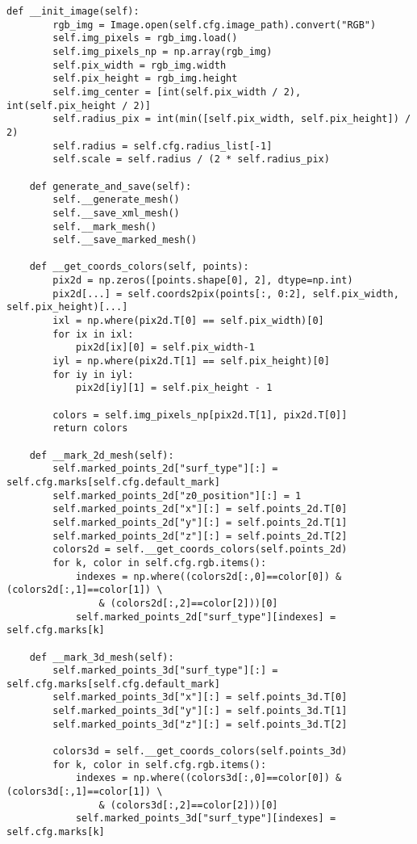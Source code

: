 \begin{lstlisting}[caption=Исходный код модуля генерации расчетной сетки и её маркировки, 
                    label={lst_meshgen_all}, basicstyle=\scriptsize]
    def __init_image(self):
        rgb_img = Image.open(self.cfg.image_path).convert("RGB")
        self.img_pixels = rgb_img.load()
        self.img_pixels_np = np.array(rgb_img)
        self.pix_width = rgb_img.width
        self.pix_height = rgb_img.height
        self.img_center = [int(self.pix_width / 2), int(self.pix_height / 2)]
        self.radius_pix = int(min([self.pix_width, self.pix_height]) / 2)
        self.radius = self.cfg.radius_list[-1]
        self.scale = self.radius / (2 * self.radius_pix)

    def generate_and_save(self):
        self.__generate_mesh()
        self.__save_xml_mesh()
        self.__mark_mesh()
        self.__save_marked_mesh()

    def __get_coords_colors(self, points):
        pix2d = np.zeros([points.shape[0], 2], dtype=np.int)
        pix2d[...] = self.coords2pix(points[:, 0:2], self.pix_width, self.pix_height)[...]
        ixl = np.where(pix2d.T[0] == self.pix_width)[0]
        for ix in ixl:
            pix2d[ix][0] = self.pix_width-1
        iyl = np.where(pix2d.T[1] == self.pix_height)[0]
        for iy in iyl:
            pix2d[iy][1] = self.pix_height - 1

        colors = self.img_pixels_np[pix2d.T[1], pix2d.T[0]]
        return colors

    def __mark_2d_mesh(self):
        self.marked_points_2d["surf_type"][:] = self.cfg.marks[self.cfg.default_mark]
        self.marked_points_2d["z0_position"][:] = 1
        self.marked_points_2d["x"][:] = self.points_2d.T[0]
        self.marked_points_2d["y"][:] = self.points_2d.T[1]
        self.marked_points_2d["z"][:] = self.points_2d.T[2]
        colors2d = self.__get_coords_colors(self.points_2d)
        for k, color in self.cfg.rgb.items():
            indexes = np.where((colors2d[:,0]==color[0]) & (colors2d[:,1]==color[1]) \ 
                & (colors2d[:,2]==color[2]))[0]
            self.marked_points_2d["surf_type"][indexes] = self.cfg.marks[k]

    def __mark_3d_mesh(self):
        self.marked_points_3d["surf_type"][:] = self.cfg.marks[self.cfg.default_mark]
        self.marked_points_3d["x"][:] = self.points_3d.T[0]
        self.marked_points_3d["y"][:] = self.points_3d.T[1]
        self.marked_points_3d["z"][:] = self.points_3d.T[2]

        colors3d = self.__get_coords_colors(self.points_3d)
        for k, color in self.cfg.rgb.items():
            indexes = np.where((colors3d[:,0]==color[0]) & (colors3d[:,1]==color[1]) \ 
                & (colors3d[:,2]==color[2]))[0]
            self.marked_points_3d["surf_type"][indexes] = self.cfg.marks[k]


\end{lstlisting}
